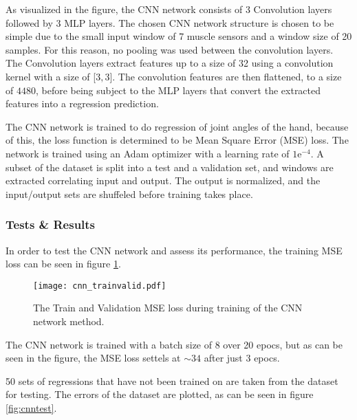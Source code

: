 \documentclass[../main.tex]{subfiles}
\begin{document}
As visualized in the figure, the CNN network consists of 3 Convolution layers followed by 3 MLP layers.
The chosen CNN network structure is chosen to be simple due to the small input window of 7 muscle sensors and a window size of 20 samples.
For this reason, no pooling was used between the convolution layers.
The Convolution layers extract features up to a size of 32 using a convolution kernel with a size of [$3, 3$].
The convolution features are then flattened, to a size of $4480$, before being subject to the MLP layers that convert the extracted features into a regression prediction. 

The CNN network is trained to do regression of joint angles of the hand, because of this, the loss function is determined to be Mean Square Error (MSE) loss.
The network is trained using an Adam optimizer with a learning rate of $1\text{e}^{-4}$.
A subset of the dataset is split into a test and a validation set, and windows are extracted correlating input and output.
The output is normalized, and the input/output sets are shuffeled before training takes place.

\subsubsection{Tests \& Results}

In order to test the CNN network and assess its performance, the training MSE loss can be seen in figure \ref{fig:cnntrainvalid}.

\begin{figure}[H]
\begin{center}
\texttt{[image: cnn\_trainvalid.pdf]}
\caption{The Train and Validation MSE loss during training of the CNN network method.}
\label{fig:cnntrainvalid}
\end{center}
\end{figure}

The CNN network is trained with a batch size of 8 over 20 epocs, but as can be seen in the figure, the MSE loss settels at $\sim 34$ after just 3 epocs.

50 sets of regressions that have not been trained on are taken from the dataset for testing.
The errors of the dataset are plotted, as can be seen in figure \ref{fig:cnntest}.
\end{document}
